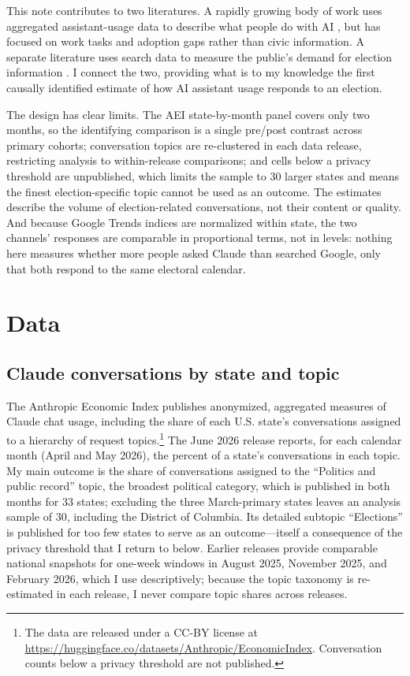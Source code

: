 \documentclass[12pt]{article}
\begin{document}
This note contributes to two literatures. A rapidly growing body of work uses aggregated assistant-usage data to describe what people do with AI \citep{handa2025economic, tomlinson2025working}, but has focused on work tasks and adoption gaps rather than civic information. A separate literature uses search data to measure the public's demand for election information \citep{stephensdavidowitz2014cost, trevisan2018search}. I connect the two, providing what is to my knowledge the first causally identified estimate of how AI assistant usage responds to an election.

The design has clear limits. The AEI state-by-month panel covers only two months, so the identifying comparison is a single pre/post contrast across primary cohorts; conversation topics are re-clustered in each data release, restricting analysis to within-release comparisons; and cells below a privacy threshold are unpublished, which limits the sample to 30 larger states and means the finest election-specific topic cannot be used as an outcome. The estimates describe the volume of election-related conversations, not their content or quality. And because Google Trends indices are normalized within state, the two channels' responses are comparable in proportional terms, not in levels: nothing here measures whether more people asked Claude than searched Google, only that both respond to the same electoral calendar.

\section*{Data}

\subsection*{Claude conversations by state and topic}

The Anthropic Economic Index publishes anonymized, aggregated measures of Claude chat usage, including the share of each U.S. state's conversations assigned to a hierarchy of request topics.\footnote{The data are released under a CC-BY license at \url{https://huggingface.co/datasets/Anthropic/EconomicIndex}. Conversation counts below a privacy threshold are not published.} The June 2026 release reports, for each calendar month (April and May 2026), the percent of a state's conversations in each topic. My main outcome is the share of conversations assigned to the ``Politics and public record'' topic, the broadest political category, which is published in both months for 33 states; excluding the three March-primary states leaves an analysis sample of 30, including the District of Columbia. Its detailed subtopic ``Elections'' is published for too few states to serve as an outcome---itself a consequence of the privacy threshold that I return to below. Earlier releases provide comparable national snapshots for one-week windows in August 2025, November 2025, and February 2026, which I use descriptively; because the topic taxonomy is re-estimated in each release, I never compare topic shares across releases.
\end{document}

